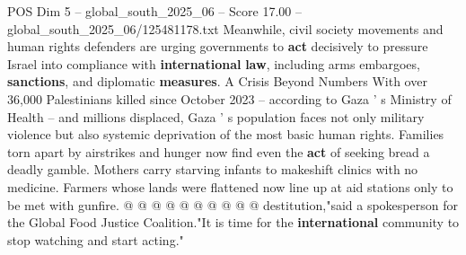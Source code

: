 \begin{textsample}{POS Dim 5 – global\_south\_2025\_06 – Score 17.00 – global\_south\_2025\_06/125481178.txt}
Meanwhile, civil society movements and human rights defenders are urging governments to \textbf{act} decisively to pressure Israel into compliance with \textbf{international} \textbf{law}, including arms embargoes, \textbf{sanctions}, and diplomatic \textbf{measures}.
A Crisis Beyond Numbers With over 36,000 Palestinians killed since October 2023 -- according to Gaza ' s Ministry of Health -- and millions displaced, Gaza ' s population faces not only military violence but also systemic deprivation of the most basic human rights.
Families torn apart by airstrikes and hunger now find even the \textbf{act} of seeking bread a deadly gamble.
Mothers carry starving infants to makeshift clinics with no medicine.
Farmers whose lands were flattened now line up at aid stations only to be met with gunfire. @ @ @ @ @ @ @ @ @ @ destitution,"said a spokesperson for the Global Food Justice Coalition."It is time for the \textbf{international} community to stop watching and start acting."

\end{textsample}
